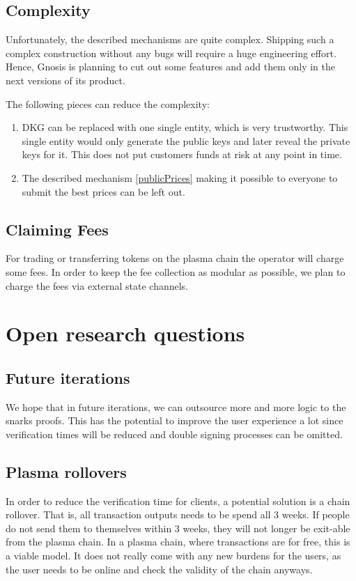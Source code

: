 \documentclass[11pt,parskip=full]{scrartcl}%
\begin{document}
\subsection{Complexity}
Unfortunately, the described mechanisms are quite complex. 
Shipping such a complex construction without any bugs will require a huge engineering effort. 
Hence, Gnosis is planning to cut out some features and add them only in the next versions of its product. 

The following pieces can reduce the complexity:
\begin{enumerate}
\item
DKG can be replaced with one single entity, which is very trustworthy. 
This single entity would only generate the public keys and later reveal the private keys for it. 
This does not put customers funds at risk at any point in time. 
\item
The described mechanism \ref{publicPrices} making it possible to everyone to submit the best prices can be left out. 
\end{enumerate}



\subsection{Claiming Fees}
For trading or transferring tokens on the plasma chain the operator will charge some fees. In order to keep the fee collection as modular as possible, we plan to charge the fees via external state channels.

\section{Open research questions}

\subsection{Future iterations}
We hope that in future iterations, we can outsource more and more logic to the snarks proofs. 
This has the potential to improve the user experience a lot since verification times will be reduced and double signing processes can be omitted. 

\subsection{Plasma rollovers}
In order to reduce the verification time for clients, a potential solution is a chain rollover. 
That is, all transaction outputs needs to be spend all 3 weeks. 
If people do not send them to themselves within 3 weeks, they will not longer be exit-able from the plasma chain. 
In a plasma chain, where transactions are for free, this is a viable model. 
It does not really come with any new burdens for the users, as the user needs to be online and check the validity of the chain anyways.
\end{document}
